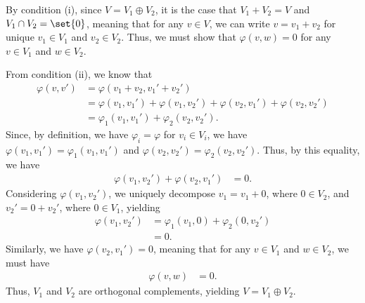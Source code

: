 \documentclass[10pt]{mypackage}
\begin{document}
\begin{solution}
  By condition (i), since $V = V_1 \oplus V_2$, it is the case that $V_1 + V_2 = V$ and $V_1\cap V_2 = \set{0}$, meaning that for any $v\in V$, we can write $v = v_1 + v_2$ for unique $v_1\in V_1$ and $v_2\in V_2$. Thus, we must show that $\varphi\left(v,w\right) = 0$ for any $v\in V_1$ and $w\in V_2$.\newline

  From condition (ii), we know that
  \begin{align*}
    \varphi\left(v,v'\right) &= \varphi\left(v_1 + v_2,v_1' + v_2'\right)\\
                             &= \varphi\left(v_1,v_1'\right) + \varphi\left(v_1,v_2'\right) + \varphi\left(v_2,v_1'\right) + \varphi\left(v_2,v_2'\right)\\
                             &= \varphi_1\left(v_1,v_1'\right) + \varphi_2\left(v_2,v_2'\right).
  \end{align*}
  Since, by definition, we have $\varphi_i = \varphi$ for $v_i\in V_i$, we have $\varphi\left(v_1,v_1'\right) = \varphi_1\left(v_1,v_1'\right)$ and $\varphi\left(v_2,v_2'\right) = \varphi_2\left(v_2,v_2'\right)$. Thus, by this equality, we have
  \begin{align*}
    \varphi\left(v_1,v_2'\right) + \varphi\left(v_2,v_1'\right) &= 0.
  \end{align*}
  Considering $\varphi\left(v_1,v_2'\right)$, we uniquely decompose $v_1 = v_1 + 0$, where $0\in V_2$, and $v_2' = 0 + v_2'$, where $0\in V_1$, yielding
  \begin{align*}
    \varphi\left(v_1,v_2'\right) &= \varphi_1\left(v_1,0\right) + \varphi_2\left(0,v_2'\right)\\
                                 &= 0.
  \end{align*}
  Similarly, we have $\varphi\left(v_2,v_1'\right) = 0$, meaning that for any $v\in V_1$ and $w\in V_2$, we must have
  \begin{align*}
    \varphi\left(v,w\right) &= 0.
  \end{align*}
  Thus, $V_1$ and $V_2$ are orthogonal complements, yielding $V = V_1 \oplus V_2$.
\end{solution}
\end{document}
